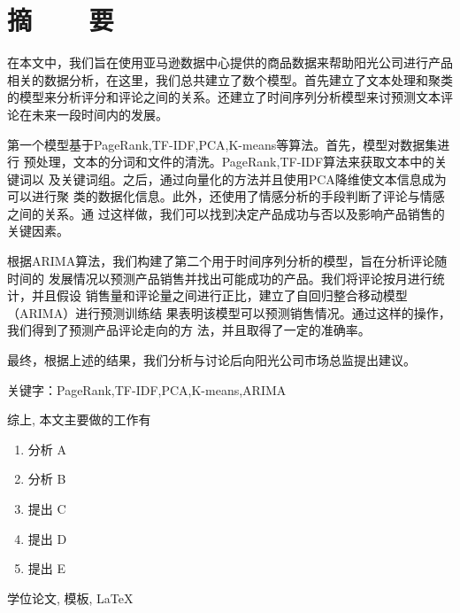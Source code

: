 \renewcommand{\baselinestretch}{1.5}
\fontsize{12pt}{13pt}\selectfont

\chapter[摘要]{摘~~~~要}
在本文中，我们旨在使用亚马逊数据中心提供的商品数据来帮助阳光公司进行产品
相关的数据分析，在这里，我们总共建立了数个模型。首先建立了文本处理和聚类
的模型来分析评分和评论之间的关系。还建立了时间序列分析模型来讨预测文本评
论在未来一段时间内的发展。

第一个模型基于PageRank,TF-IDF,PCA,K-means等算法。首先，模型对数据集进行
预处理，文本的分词和文件的清洗。PageRank,TF-IDF算法来获取文本中的关键词以
及关键词组。之后，通过向量化的方法并且使用PCA降维使文本信息成为可以进行聚
类的数据化信息。此外，还使用了情感分析的手段判断了评论与情感之间的关系。通
过这样做，我们可以找到决定产品成功与否以及影响产品销售的关键因素。

根据ARIMA算法，我们构建了第二个用于时间序列分析的模型，旨在分析评论随时间的
发展情况以预测产品销售并找出可能成功的产品。我们将评论按月进行统计，并且假设
销售量和评论量之间进行正比，建立了自回归整合移动模型（ARIMA）进行预测训练结
果表明该模型可以预测销售情况。通过这样的操作，我们得到了预测产品评论走向的方
法，并且取得了一定的准确率。

最终，根据上述的结果，我们分析与讨论后向阳光公司市场总监提出建议。

关键字：PageRank,TF-IDF,PCA,K-means,ARIMA


综上, 本文主要做的工作有
\vspace{-10pt}
\begin{enumerate}
    \item 分析 A
    \item 分析 B
    \item 提出 C
    \item 提出 D
    \item 提出 E
\end{enumerate}
\vspace{-10pt}

\vspace{1em}
 \quad 学位论文, 模板, \LaTeX

\clearpage
\endinput
